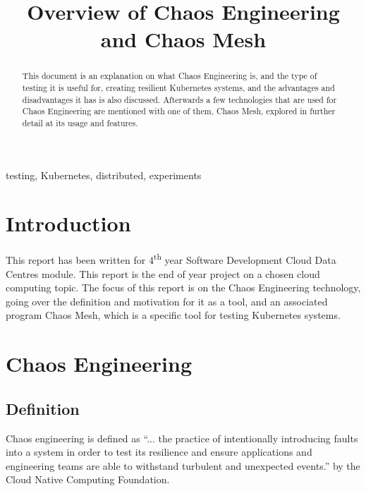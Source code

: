\documentclass[conference]{IEEEtran}
\begin{document}
\title{Overview of Chaos Engineering and Chaos Mesh}

\author{
}

\maketitle

\begin{abstract}
This document is an explanation on what Chaos Engineering is, and the type of testing it is useful for, creating resilient Kubernetes systems, and the advantages and disadvantages it has is also discussed. Afterwards a few technologies that are used for Chaos Engineering are mentioned with one of them, Chaos Mesh, explored in further detail at its usage and features.
\end{abstract}

\begin{IEEEkeywords}
testing, Kubernetes, distributed, experiments
\end{IEEEkeywords}

\section{Introduction}
This report has been written for 4\textsuperscript{th} year Software Development Cloud Data Centres module. This report is the end of year project on a chosen cloud computing topic. The focus of this report is on the Chaos Engineering technology, going over the definition and motivation for it as a tool, and an associated program Chaos Mesh, which is a specific tool for testing Kubernetes systems.

\section{Chaos Engineering}
\subsection{Definition}

Chaos engineering is defined as ``... the practice of intentionally introducing faults into a system in order to test its resilience and ensure applications and engineering teams are able to withstand turbulent and unexpected events.'' by the Cloud Native Computing Foundation. \cite{b1}
\end{document}
